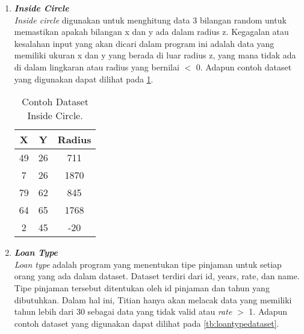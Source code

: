 \begin{enumerate}
      \item \emph{\textbf{Inside Circle}} \\
            \emph{Inside circle} digunakan untuk menghitung data 3 bilangan random untuk memastikan apakah bilangan x dan y ada dalam radius z. Kegagalan atau kesalahan input yang akan dicari dalam program ini adalah data yang memiliki ukuran x dan y yang berada di luar radius z, yang mana tidak ada di dalam lingkaran atau radius yang bernilai $ < $ 0.
            Adapun contoh dataset yang digunakan dapat 
            dilihat pada \ref{tb:insidecircledataset}.

            \begin{longtable}{|c|c|c|}
                  \caption{Contoh Dataset Inside Circle.}
                  \label{tb:insidecircledataset} \\
                  \hline
                  \rowcolor[HTML]{C0C0C0}
                  \textbf{X} & \textbf{Y} & \textbf{Radius} \\
                  \hline
                  49 & 26 & 711 \\
                  7 & 26 & 1870 \\
                  79 & 62 & 845 \\
                  64 & 65 & 1768 \\
                  2 & 45 & -20 \\
                  \hline
            \end{longtable}

      \item \emph{\textbf{Loan Type}} \\
            \emph{Loan type} adalah program yang menentukan tipe pinjaman untuk setiap orang yang ada dalam dataset. Dataset terdiri dari id, years, rate, dan name. Tipe pinjaman tersebut ditentukan oleh id pinjaman dan tahun yang dibutuhkan. Dalam hal ini, Titian hanya akan melacak data yang memiliki tahun lebih dari 30 sebagai data yang tidak valid atau \emph{rate} $ > $ 1.
            Adapun contoh dataset yang digunakan dapat 
            dilihat pada \ref{tb:loantypedataset}.


\end{enumerate}
